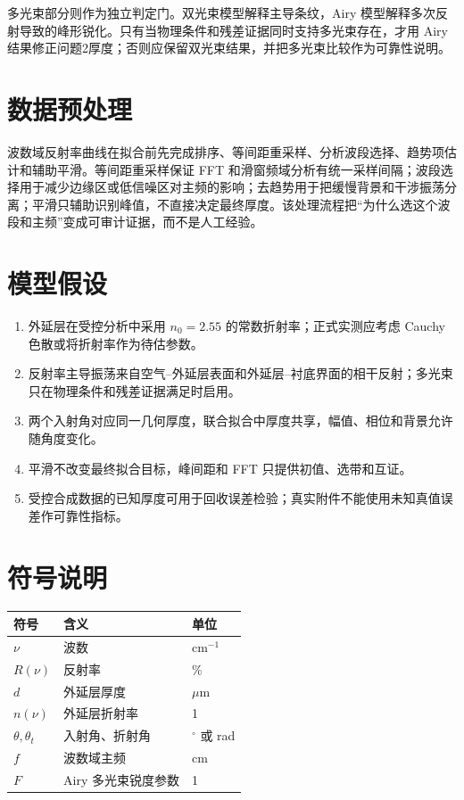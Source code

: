 \documentclass[UTF8]{ctexart}
\begin{document}
多光束部分则作为独立判定门。双光束模型解释主导条纹，Airy 模型解释多次反射导致的峰形锐化。只有当物理条件和残差证据同时支持多光束存在，才用 Airy 结果修正问题2厚度；否则应保留双光束结果，并把多光束比较作为可靠性说明。

\section{数据预处理}
波数域反射率曲线在拟合前先完成排序、等间距重采样、分析波段选择、趋势项估计和辅助平滑。等间距重采样保证 FFT 和滑窗频域分析有统一采样间隔；波段选择用于减少边缘区或低信噪区对主频的影响；去趋势用于把缓慢背景和干涉振荡分离；平滑只辅助识别峰值，不直接决定最终厚度。该处理流程把“为什么选这个波段和主频”变成可审计证据，而不是人工经验。

\section{模型假设}
\begin{enumerate}
\item 外延层在受控分析中采用 $n_0=2.55$ 的常数折射率；正式实测应考虑 Cauchy 色散或将折射率作为待估参数。
\item 反射率主导振荡来自空气--外延层表面和外延层--衬底界面的相干反射；多光束只在物理条件和残差证据满足时启用。
\item 两个入射角对应同一几何厚度，联合拟合中厚度共享，幅值、相位和背景允许随角度变化。
\item 平滑不改变最终拟合目标，峰间距和 FFT 只提供初值、选带和互证。
\item 受控合成数据的已知厚度可用于回收误差检验；真实附件不能使用未知真值误差作可靠性指标。
\end{enumerate}

\section{符号说明}
\begin{center}
\begin{tabular}{lll}
\toprule
符号 & 含义 & 单位\\
\midrule
$\nu$ & 波数 & $\mathrm{cm}^{-1}$\\
$R(\nu)$ & 反射率 & \%\\
$d$ & 外延层厚度 & $\mu\mathrm{m}$\\
$n(\nu)$ & 外延层折射率 & 1\\
$\theta,\theta_t$ & 入射角、折射角 & $^\circ$ 或 rad\\
$f$ & 波数域主频 & $\mathrm{cm}$\\
$F$ & Airy 多光束锐度参数 & 1\\
\bottomrule
\end{tabular}
\end{center}
\end{document}
